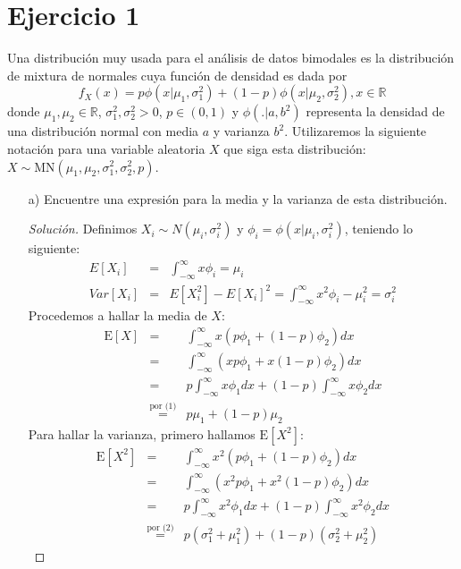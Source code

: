\documentclass[11pt]{article}
\renewcommand{\=}[1]{\stackrel{#1}{=}} %
\newenvironment{sol}
{\begin{proof}[Solución]}
	{\end{proof}}
\theoremstyle{definition}
\theoremstyle{remark}
\begin{document}
\section*{Ejercicio 1}
Una distribución muy usada para el análisis de datos bimodales es la distribución de mixtura de
normales cuya función de densidad es dada por
$$f_X(x) = p\phi(x|\mu_1,\sigma_1^2)+(1-p)\phi(x|\mu_2,\sigma_2^2), x \in \mathbb{R}$$
donde $\mu_1,\mu_2 \in \mathbb{R}$, $\sigma_1^2,\sigma_2^2 > 0$, $p \in (0,1)$ y $\phi(.|a,b^2)$ representa la densidad de una distribución normal con media $a$ y varianza $b^2$. Utilizaremos la siguiente notación para una variable aleatoria $X$ que siga esta distribución: $X \sim \text{MN}(\mu_1,\mu_2,\sigma_1^2,\sigma_2^2,p)$.
\begin{itemize}
	\item[a)] Encuentre una expresión para la media y la varianza de esta distribución.
	\begin{sol}
		Definimos $X_i \sim N(\mu_i,\sigma_i^2)$ y $\phi_i = \phi(x|\mu_i,\sigma_i^2)$, teniendo lo siguiente:
		\begin{eqnarray}
		E[X_i]&=&\int_{-\infty}^{\infty}x\phi_i = \mu_i\\
		Var[X_i]&=&E[X_i^2]-E[X_i]^2 = \int_{-\infty}^{\infty}x^2\phi_i - \mu_i^2 = \sigma_i^2
		\end{eqnarray}
		Procedemos a hallar la media de $X$:
		\begin{eqnarray}
		\text{E}\left[X\right] &=& \int_{-\infty}^\infty x(p\phi_1 + (1-p)\phi_2)dx\nonumber\\
		&=& \int_{-\infty}^\infty (xp\phi_1 + x(1-p)\phi_2)dx\nonumber\\
		&=& p\int_{-\infty}^\infty x\phi_1dx + (1-p)\int_{-\infty}^\infty x\phi_2dx\nonumber\\
		&\stackrel{\mbox{por (1)}}{=}& p\mu_1 + (1-p)\mu_2
		\end{eqnarray}
		Para hallar la varianza, primero hallamos $\text{E}\left[X^2\right]$:
		\begin{eqnarray}
		\text{E}\left[X^2\right] &=& \int_{-\infty}^\infty x^2(p\phi_1 + (1-p)\phi_2)dx\nonumber\\
		&=& \int_{-\infty}^\infty (x^2p\phi_1 + x^2(1-p)\phi_2)dx\nonumber\\
		&=& p\int_{-\infty}^\infty x^2\phi_1dx + (1-p)\int_{-\infty}^\infty x^2\phi_2dx\nonumber\\
		&\stackrel{\mbox{por (2)}}{=}& p\left(\sigma_1^2 + \mu_1^2\right) + (1-p)\left(\sigma_2^2 + \mu_2^2\right)
		\end{eqnarray}

\end{sol}
\end{itemize}
\end{document}
